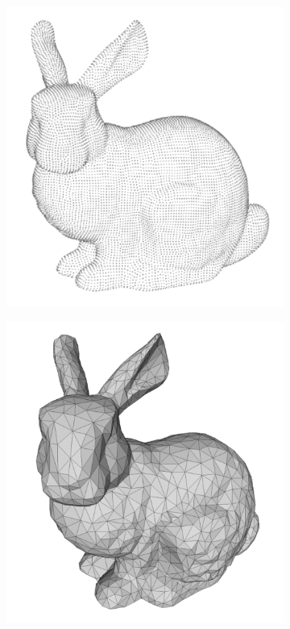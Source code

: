 \documentclass[binding=0.6cm,noexaminfo]{sapthesis}
\begin{document}
\begin{figure}[h!]
\centering
\begin{subfigure}{.32\textwidth}
	\centering
	\includegraphics[width=\linewidth]{bunny-point}
	\caption{}
\end{subfigure}
\begin{subfigure}{.32\textwidth}
	\centering
	\includegraphics[width=\linewidth]{bunny-mesh}

\end{subfigure}
\end{figure}
\end{document}
